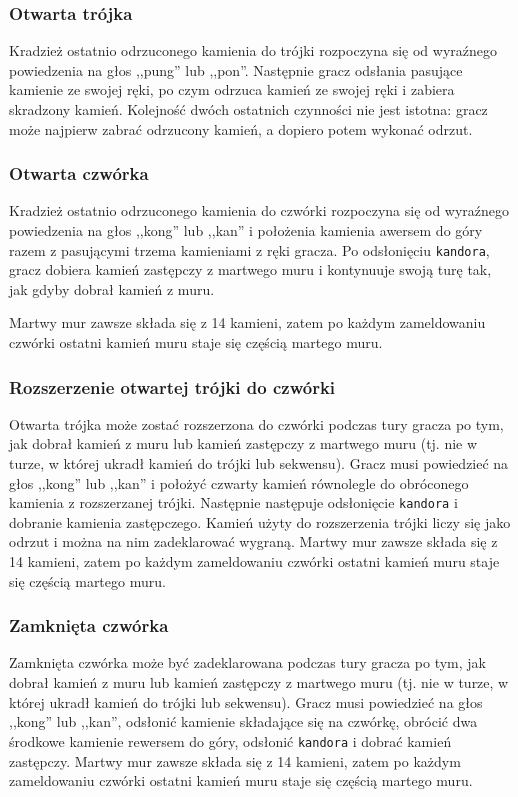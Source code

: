 \subsubsection{Otwarta trójka}
Kradzież ostatnio odrzuconego kamienia do trójki rozpoczyna się od wyraźnego
powiedzenia na głos ,,pung'' lub ,,pon''.
Następnie gracz odsłania pasujące kamienie ze swojej ręki, po czym odrzuca
kamień ze swojej ręki i zabiera skradzony kamień.
Kolejność dwóch ostatnich czynności nie jest istotna: gracz może najpierw zabrać
odrzucony kamień, a dopiero potem wykonać odrzut.

\subsubsection{Otwarta czwórka}
Kradzież ostatnio odrzuconego kamienia do czwórki rozpoczyna się od wyraźnego
powiedzenia na głos ,,kong'' lub ,,kan'' i położenia kamienia awersem do góry
razem z pasującymi trzema kamieniami z ręki gracza.
Po odsłonięciu \texttt{kandora}, gracz dobiera kamień zastępczy z martwego muru
i kontynuuje swoją turę tak, jak gdyby dobrał kamień z muru.

Martwy mur zawsze składa się z 14 kamieni, zatem po każdym zameldowaniu czwórki
ostatni kamień muru staje się częścią martego muru.

\subsubsection{Rozszerzenie otwartej trójki do czwórki}
Otwarta trójka może zostać rozszerzona do czwórki podczas tury gracza po tym,
jak dobrał kamień z muru lub kamień zastępczy z martwego muru (tj. nie w turze,
w której ukradł kamień do trójki lub sekwensu).
Gracz musi powiedzieć na głos ,,kong'' lub ,,kan'' i położyć czwarty kamień
równolegle do obróconego kamienia z rozszerzanej trójki.
Następnie następuje odsłonięcie \texttt{kandora} i dobranie kamienia
zastępczego.
Kamień użyty do rozszerzenia trójki liczy się jako odrzut i można na nim
zadeklarować wygraną.
Martwy mur zawsze składa się z 14 kamieni, zatem po każdym zameldowaniu czwórki
ostatni kamień muru staje się częścią martego muru.

\subsubsection{Zamknięta czwórka}
Zamknięta czwórka może być zadeklarowana podczas tury gracza po tym, jak dobrał
kamień z muru lub kamień zastępczy z martwego muru (tj. nie w turze, w której
ukradł kamień do trójki lub sekwensu).
Gracz musi powiedzieć na głos ,,kong'' lub ,,kan'', odsłonić kamienie składające
się na czwórkę, obrócić dwa środkowe kamienie rewersem do góry, odsłonić
\texttt{kandora} i dobrać kamień zastępczy.
Martwy mur zawsze składa się z 14 kamieni, zatem po każdym zameldowaniu czwórki
ostatni kamień muru staje się częścią martego muru.

